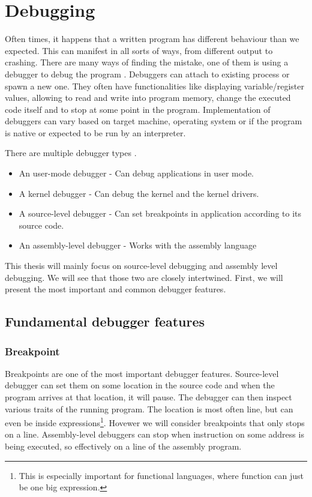 \chapter{Debugging}
Often times, it happens that a written program has different behaviour than we expected. This can manifest in all sorts of ways, from different output to crashing. There are many ways of finding the mistake, one of them is using a debugger to debug the program \cite{software-debugging-testing-verification}.
Debuggers can attach to existing process or spawn a new one. They often have functionalities like displaying variable/register values, allowing to read and write into program memory, change the executed code itself and to stop at some point in the program. Implementation of debuggers can vary based on target machine, operating system or if the program is native or expected to be run by an interpreter.

There are multiple debugger types .
\begin{itemize}
    \item An user-mode debugger - Can debug applications in user mode.
    \item A kernel debugger - Can debug the kernel and the kernel drivers.
    \item A source-level debugger - Can set breakpoints in application according to its source code.
    \item An assembly-level debugger - Works with the assembly language
\end{itemize}

This thesis will mainly focus on source-level debugging and assembly level debugging. We will see that those two are closely intertwined. First, we will present the most important and common debugger features.

\section{Fundamental debugger features}
\subsection{Breakpoint}\label{breakpoint}
Breakpoints are one of the most important debugger features. Source-level debugger can set them on some location in the source code and when the program arrives at that location, it will pause. The debugger can then inspect various traits of the running program. The location is most often line, but can even be inside expressions\footnote{This is especially important for functional languages, where function can just be one big expression.}. Hovewer we will consider breakpoints that only stops on a line. Assembly-level debuggers can stop when instruction on some address is being executed, so effectively on a line of the assembly program.

